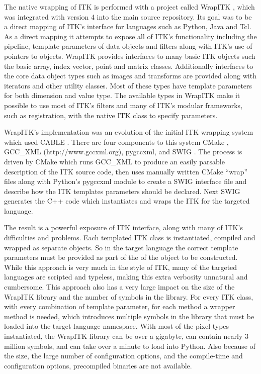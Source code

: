 \documentclass{frontiersMED} %
\begin{document}
The native wrapping of ITK is performed with a project called WrapITK
\cite{Lehmann2006}, which was integrated with version 4 into the main source
repository. Its goal was to be a direct mapping of ITK's interface for
languages such as Python, Java and Tcl. As a direct mapping it
attempts to expose all of ITK's functionality including the pipeline,
template parameters of data objects and filters along with ITK's use
of pointers to objects. WrapITK provides interfaces to many basic ITK
objects such the basic array, index vector, point and matrix
classes. Additionally interfaces to the core data object types such as
images and transforms are provided along with iterators and other
utility classes. Most of these types have template parameters for both
dimension and value type. The available types in WrapITK make it
possible to use most of ITK's filters and many of ITK's modular
frameworks, such as registration, with the native ITK class to specify
parameters.

WrapITK's implementation was an evolution of the initial ITK wrapping
system which used CABLE \cite{Lehmann2006}. There are four components to
this system CMake \cite{Martin2003}, GCC\_XML (http://www.gccxml.org), pygccxml, and SWIG
\cite{Beazley2003}. The process is driven by CMake which runs GCC\_XML to
produce an easily parsable description of the ITK source code, then
uses manually written CMake ``wrap'' files along with Python's pygccxml
module to create a SWIG interface file and describe how the ITK
templates parameters should be declared. Next SWIG generates the C++
code which instantiates and wraps the ITK for the targeted language.

The result is a powerful exposure of ITK interface, along with many of
ITK's difficulties and problems. Each templated ITK class is
instantiated, compiled and wrapped as separate objects. So in the
target language the correct template parameters must be provided as
part of the of the object to be constructed. While this approach is
very much in the style of ITK, many of the targeted languages are
scripted and typeless, making this extra verbosity unnatural and
cumbersome.  This approach also has a very large impact on the size of
the WrapITK library and the number of symbols in the library. For
every ITK class, with every combination of template parameter, for
each method a wrapper method is needed, which introduces multiple
symbols in the library that must be loaded into the target language
namespace. With most of the pixel types instantiated, the WrapITK
library can be over a gigabyte, can contain nearly 3 million symbols,
and can take over a minute to load into Python. Also because of the size,
the large number of configuration options, and the compile-time and
configuration options, precompiled binaries are not available.
\end{document}
